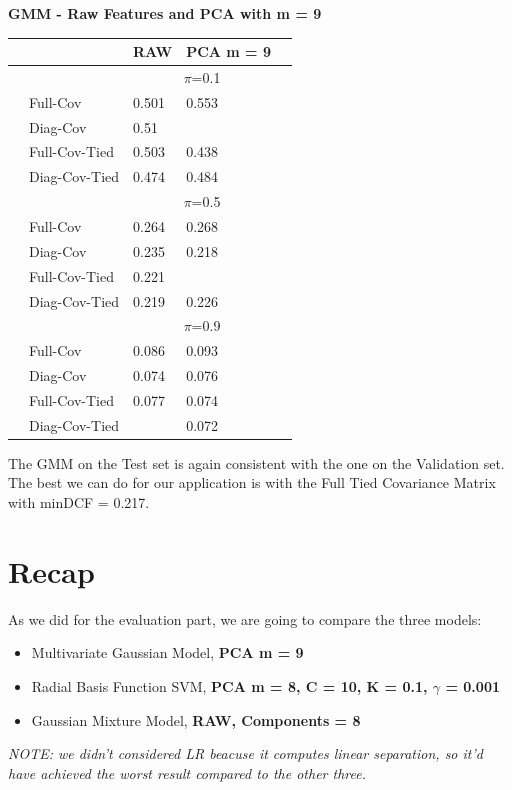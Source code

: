 \documentclass[english]{report}
\begin{document}
\textbf{GMM - Raw Features and PCA with m = 9}
\begin{table}[H]
    \centering
    \begin{tabular}{ll|l|ll}
        \hline
                                & & RAW & PCA m = 9 \\ \hline
                                & & \multicolumn{2}{c}{$\pi$=0.1} \\ \hline
                                & Full-Cov        & 0.501  & 0.553 \\
                                & Diag-Cov        & 0.51 & \color{red}{0.467} \\
                                & Full-Cov-Tied   & 0.503 & 0.438 \\ 
                                & Diag-Cov-Tied   & 0.474 & 0.484 \\ \hline

                                & & \multicolumn{2}{c}{$\pi$=0.5} \\ \hline
                                & Full-Cov          & 0.264  & 0.268   \\
                                & Diag-Cov          & 0.235  & 0.218 \\
                                & Full-Cov-Tied     & 0.221  & \color{red}{0.217} \\ 
                                & Diag-Cov-Tied     & 0.219  & 0.226 \\ \hline

                                & & \multicolumn{2}{c}{$\pi$=0.9} \\ \hline
                                & Full-Cov          & 0.086  & 0.093  \\
                                & Diag-Cov          & 0.074  & 0.076\\
                                & Full-Cov-Tied     & 0.077  & 0.074\\ 
                                & Diag-Cov-Tied     & \color{red}{0.071}  & 0.072\\  
    \hline
    \end{tabular}
    \label{tab:GMM_RAW_eval}
\end{table}
The GMM on the Test set is again consistent with the one on the Validation set.
The best we can do for our application is with the Full Tied Covariance Matrix with minDCF = 0.217.

\newpage
\section{Recap}
As we did for the evaluation part, we are going to compare the three models:
\begin{itemize}
    \item Multivariate Gaussian Model, \textbf{PCA m = 9}
    \item Radial Basis Function SVM, \textbf{PCA m = 8, C = 10, K = 0.1, $\gamma$ = 0.001}
    \item Gaussian Mixture Model, \textbf{RAW, Components = 8}
\end{itemize}
\textit{NOTE: we didn't considered LR beacuse it computes linear separation, so it'd have achieved the worst
result compared to the other three.}
\end{document}
